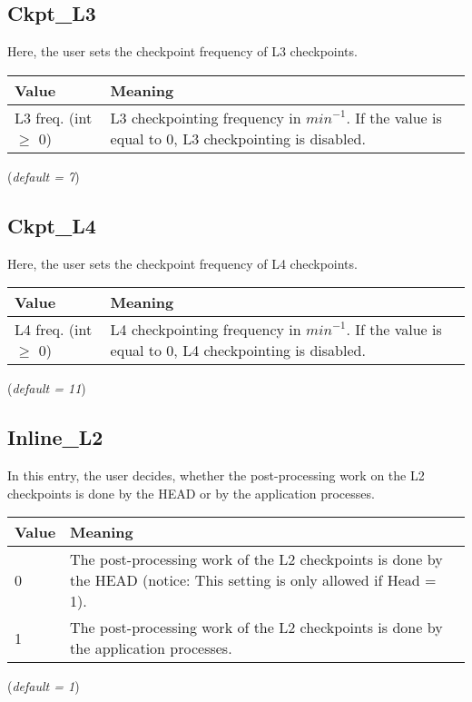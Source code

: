 \documentclass{refrep}
\begin{document}
\subsection{Ckpt\_L3}\label{subsec:ckptl3}
Here, the user sets the checkpoint frequency of L3 checkpoints.
\begin{center}
\begin{tabular}[h!]{|p{}|p{}|}
\hline
\textbf{Value} & \textbf{Meaning} \\ \hline
L3 freq. (int $\geq$ 0)  & L3 checkpointing frequency in $\textit{min}^{-1}$. If the value is equal to 0, L3 checkpointing is disabled.  \\ \hline
\end{tabular}
\end{center}
(\textit{default = 7})
\subsection{Ckpt\_L4}\label{subsec:ckptl4}
Here, the user sets the checkpoint frequency of L4 checkpoints.
\begin{center}
\begin{tabular}[h!]{|p{}|p{}|}
\hline
\textbf{Value} & \textbf{Meaning} \\ \hline
L4 freq. (int $\geq$ 0)  & L4 checkpointing frequency in $\textit{min}^{-1}$. If the value is equal to 0, L4 checkpointing is disabled.  \\ \hline
\end{tabular}
\end{center}
(\textit{default = 11})
\subsection{Inline\_L2}\label{subsec:inlinel2}
In this entry, the user decides, whether the post-processing work on the L2 checkpoints is done by the HEAD or by the application processes.
\begin{center}
\begin{tabular}[h!]{|p{}|p{}|}
\hline
\textbf{Value} & \textbf{Meaning} \\ \hline
0 & The post-processing work of the L2 checkpoints is done by the HEAD (notice: This setting is only allowed if Head = 1).  \\ \hline
1 & The post-processing work of the L2 checkpoints is done by the application processes.  \\ \hline
\end{tabular}
\end{center}
(\textit{default = 1})
\end{document}
